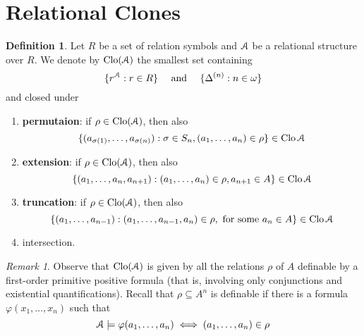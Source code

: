 \documentclass{amsart}
\theoremstyle{plain}
\theoremstyle{definition}
\newtheorem{definition}[theorem]{Definition}
\theoremstyle{remark}
\newtheorem{remark}[theorem]{Remark}
\def\phi{\varphi}
\DeclareMathOperator{\Clo}{Clo}
\begin{document}
\section{Relational Clones} 
\begin{definition}
    Let $R$ be a set of relation symbols and $\EuScript{A}$ be a relational structure over $R$.
    We denote by $\Clo(\EuScript{A})$ the smallest set containing 
    \begin{equation*}
        \{r^\EuScript{A} : r \in R\} \quad \text{ and } \quad \{\Delta^{(n)} : n \in \omega\}
    \end{equation*}
    and closed under 
    \begin{enumerate}
        \item \textbf{permutaion}: if $\rho \in \Clo(\EuScript{A})$, then also
        \begin{equation*}
            \{(a_{\sigma(1)}, \ldots, a_{\sigma(n)}) : \sigma \in S_n, (a_1, \ldots, a_n) \in \rho\} \in \Clo{\EuScript{A}}
        \end{equation*} 
        \item \textbf{extension}: if $\rho \in \Clo(\EuScript{A})$, then also
        \begin{equation*}
            \{(a_{1}, \ldots, a_{n}, a_{n+1}) :  (a_1, \ldots, a_n) \in \rho, a_{n+1} \in A\} \in \Clo{\EuScript{A}}
        \end{equation*} 
        \item \textbf{truncation}: if $\rho \in \Clo(\EuScript{A})$, then also
        \begin{equation*}
            \{(a_1, \ldots, a_{n-1}): (a_1, \ldots, a_{n-1}, a_n) \in \rho, \text{ for some } a_n \in A \} \in \Clo{\EuScript{A}}
        \end{equation*}
        \item intersection. 
    \end{enumerate}
\end{definition}

\begin{remark}
    Observe that $\Clo(\EuScript{A})$ is given by all the relations $\rho$ of $A$ definable by a first-order primitive positive formula
    (that is, involving only conjunctions and existential quantifications). 
    Recall that $\rho \subseteq A^n$ is definable if there is a formula $\phi(x_1, \ldots, x_n)$ such that 
    \begin{equation*}
        \EuScript{A} \models \phi(a_1, \ldots, a_n) \iff (a_1, \ldots, a_n) \in \rho
    \end{equation*}
\end{remark}
\end{document}
